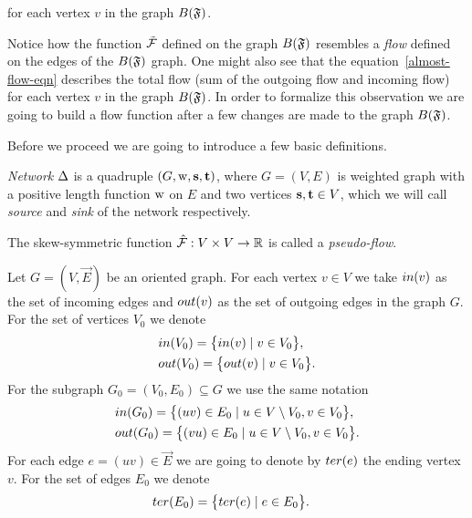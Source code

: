 \documentclass[12pt]{amsart}
\begin{document}
      for each vertex $v$ in the graph $B(\mathfrak{F})$.
    \begin{remark}
      Notice how the function $\mathcal{\tilde{F}}$ defined on the graph $B(\mathfrak{F})$ resembles
        a \emph{flow} defined on the edges of the $B(\mathfrak{F})$ graph.
      One might also see that the equation~\eqref{almost-flow-eqn} describes the total flow (sum of the outgoing flow and incoming flow) 
        for each vertex $v$ in the graph $B(\mathfrak{F})$.
      In order to formalize this observation we are going to build a flow function
        after a few changes are made to the graph $B(\mathfrak{F})$.
    \end{remark}
    Before we proceed we are going to introduce a few basic definitions.
    \begin{definition}
        \emph{Network} $\Delta$ is a quadruple $(G, \mathrm{w}, \mathbf{s}, \mathbf{t})$, where $G = (V, E)$ is weighted graph
        with a positive length function $\mathrm{w}$ on $E$ and two vertices $\mathbf{s}, \mathbf{t} \in V$, which
        we will call \emph{source} and \emph{sink} of the network respectively.
    \end{definition}
    \begin{definition}
        The skew-symmetric function $\mathcal{\hat{F}}: V \times V \to \mathbb{R}$ is called a \emph{pseudo-flow}.
    \end{definition}
    \begin{definition}
      Let $G = (V, \vec{E})$ be an oriented graph.
      For each vertex $v \in V$ we take $in(v)$ as the set of incoming edges
      and $out(v)$ as the set of outgoing edges in the graph $G$.
      For the set of vertices $V_0$ we denote
      \begin{align*}
        &in(V_0) = \big\{in(v) \mid v\in V_0\big\},\\
        &out(V_0) = \big\{out(v) \mid v\in V_0\big\}.
      \end{align*}
      For the subgraph $G_0 = (V_0, E_0) \subseteq G$ we use the same notation
      \begin{align*}
        &in(G_0) = \big\{(uv)\in E_0 \mid u \in V \setminus V_0, v \in V_0\big\},\\
        &out(G_0) = \big\{(vu) \in E_0 \mid u \in V\setminus V_0, v \in V_0\big\}.
      \end{align*}
      For each edge $e=(uv) \in \vec{E}$ we are going to denote %
        by $ter(e)$ the ending vertex $v$.
      For the set of edges $E_0$ we denote
      \begin{align*}
        &ter(E_0) = \big\{ter(e) \mid e\in E_0\big\}.
      \end{align*}
    \end{definition}
\end{document}
